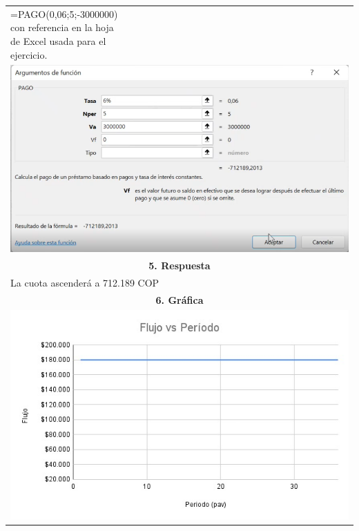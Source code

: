 \begin{center}
\begin{longtable}[H]{|p{0.333\linewidth}|p{0.3333\linewidth}|p{0.3333\linewidth}|}
{  =PAGO(0,06;5;-3000000) con referencia en la hoja de Excel usada para el ejercicio.
  }                                                                                              \\
  \multicolumn{3}{|c|}{ \includegraphics[trim=-5 -5 -5 -5 ,width=1\columnwidth]{6/Ejem6.png}}    \\
  \multicolumn{3}{|c|}{\cellcolor[HTML]{FFB183}\textbf{5. Respuesta}}                            \\ \hline
  \multicolumn{3}{|p{\columnwidth}|}{
  La cuota ascenderá a   712.189 COP
  }                                                                                              \\ \hline
  \multicolumn{3}{|c|}{\cellcolor[HTML]{FFB183}\textbf{6. Gráfica}}                              \\ \hline
  \multicolumn{3}{|c|}{\includegraphics[trim=-5 -5 -5 -5 ,width=0.7\columnwidth]{6/flujovsperiodo6.png}} \\ \hline
 \end{longtable}
\end{center}
